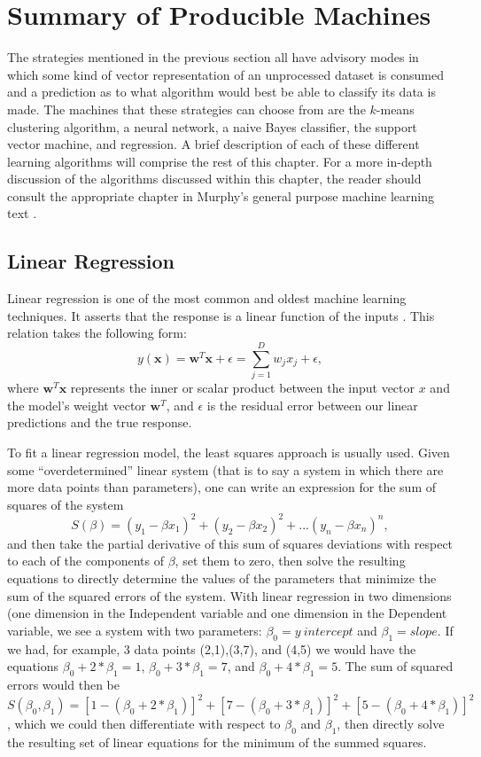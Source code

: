 \section{Summary of Producible Machines}
The strategies mentioned in the previous section all have advisory modes in which
some kind of vector representation of an unprocessed dataset is consumed and a
prediction as to what algorithm would best be able to classify its data is made.
The machines that these strategies can choose from are the $k$-means clustering
algorithm, a neural network, a naive Bayes classifier, the support
vector machine, and regression. A brief description of each of these different
learning algorithms will comprise the rest of this chapter. For a more in-depth
discussion of the algorithms discussed within this chapter, the reader should consult
the appropriate chapter in Murphy's general purpose machine learning text
\cite{Murphy}.
\subsection{Linear Regression}
Linear regression is one of the most common and oldest machine learning
techniques. It asserts that the response is a linear function
of the inputs \cite{Murphy}. This relation takes the following form:
$$ y(\textbf{x}) = \textbf{w}^T\textbf{x} + \epsilon = \sum_{j=1}^{D}w_jx_j + \epsilon,$$
where $\textbf{w}^T\textbf{x}$ represents the inner or scalar product between the input vector $x$
and the model's weight vector $\textbf{w}^T$, and $\epsilon$ is the residual error
between our linear predictions and the true response.

To fit a linear regression model, the least squares approach is usually used.
Given some  ``overdetermined'' linear system (that is to say a system in which
there are more data points than parameters), one can write an expression for the
sum of squares of the system
$$S(\beta) = (y_1 - \beta x_1)^2 + (y_2 - \beta x_2)^2 + ... (y_n - \beta x_n)^n,$$
and then take the partial derivative of this sum of squares deviations with respect
to each of the components of $\beta$, set them to zero, then solve the resulting
equations to directly determine the values of the parameters that
minimize the sum of the squared errors of the system. With linear regression in
two dimensions (one dimension in the Independent variable and one dimension in
the Dependent variable, we see a system with two parameters:
$\beta_0 = y~intercept$ and $\beta_1 = slope$. If we had, for example, 3 data
points (2,1),(3,7), and (4,5) we would have the equations
$\beta_0 + 2*\beta_1 = 1$, $\beta_0 + 3*\beta_1 = 7$, and
$\beta_0 + 4*\beta_1 = 5$. The sum of squared errors would then be
 $S(\beta_0,\beta_1)= [1 - (\beta_0 + 2*\beta_1)]^2 + [7 - (\beta_0 + 3*\beta_1)]^2 + [5 - (\beta_0 + 4*\beta_1)]^2$
, which we could then differentiate with respect to $\beta_0$ and $\beta_1$, then
directly solve the resulting set of linear equations for the minimum of
the summed squares.
